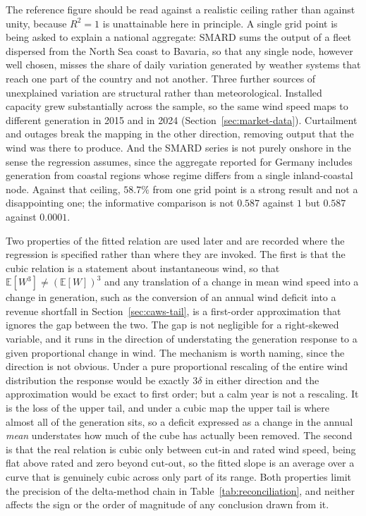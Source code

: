 \documentclass[11pt, a4paper, twoside]{article}
\begin{document}
The reference figure should be read against a realistic ceiling rather than against unity, because $R^2 = 1$ is unattainable here in principle. A single grid point is being asked to explain a national aggregate: SMARD sums the output of a fleet dispersed from the North Sea coast to Bavaria, so that any single node, however well chosen, misses the share of daily variation generated by weather systems that reach one part of the country and not another. Three further sources of unexplained variation are structural rather than meteorological. Installed capacity grew substantially across the sample, so the same wind speed maps to different generation in 2015 and in 2024 (Section~\ref{sec:market-data}). Curtailment and outages break the mapping in the other direction, removing output that the wind was there to produce. And the SMARD series is not purely onshore in the sense the regression assumes, since the aggregate reported for Germany includes generation from coastal regions whose regime differs from a single inland-coastal node. Against that ceiling, $58.7\%$ from one grid point is a strong result and not a disappointing one; the informative comparison is not $0.587$ against $1$ but $0.587$ against $0.0001$.

Two properties of the fitted relation are used later and are recorded where the regression is specified rather than where they are invoked. The first is that the cubic relation is a statement about instantaneous wind, so that $\mathbb{E}[W^3] \neq (\mathbb{E}[W])^3$ and any translation of a change in mean wind speed into a change in generation, such as the conversion of an annual wind deficit into a revenue shortfall in Section~\ref{sec:caws-tail}, is a first-order approximation that ignores the gap between the two. The gap is not negligible for a right-skewed variable, and it runs in the direction of understating the generation response to a given proportional change in wind. The mechanism is worth naming, since the direction is not obvious. Under a pure proportional rescaling of the entire wind distribution the response would be exactly $3\delta$ in either direction and the approximation would be exact to first order; but a calm year is not a rescaling. It is the loss of the upper tail, and under a cubic map the upper tail is where almost all of the generation sits, so a deficit expressed as a change in the annual \emph{mean} understates how much of the cube has actually been removed. The second is that the real relation is cubic only between cut-in and rated wind speed, being flat above rated and zero beyond cut-out, so the fitted slope is an average over a curve that is genuinely cubic across only part of its range. Both properties limit the precision of the delta-method chain in Table~\ref{tab:reconciliation}, and neither affects the sign or the order of magnitude of any conclusion drawn from it.
\end{document}
